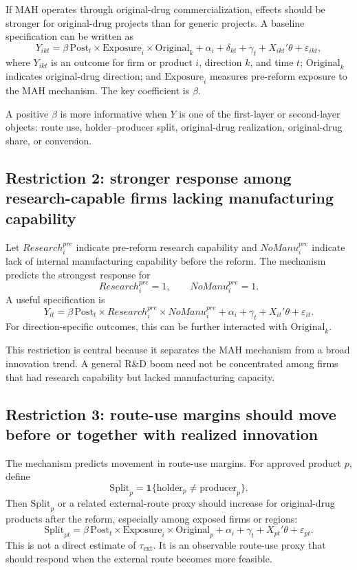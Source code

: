 \documentclass[12pt]{article}
\newcommand{\tauext}{\tau_{\mathrm{ext}}}
\newcommand{\Post}{\mathrm{Post}}
\newcommand{\Original}{\mathrm{Original}}
\newcommand{\Exposure}{\mathrm{Exposure}}
\newcommand{\Split}{\mathrm{Split}}
\newcommand{\one}{\mathbf{1}}
\begin{document}
If MAH operates through original-drug commercialization, effects should be stronger for original-drug projects than for generic projects. A baseline specification can be written as
\[
Y_{ikt}=\beta\,\Post_t\times \Exposure_i\times \Original_k
+\alpha_i+\delta_{kt}+\gamma_t+X_{ikt}'\theta+\varepsilon_{ikt},
\]
where $Y_{ikt}$ is an outcome for firm or product $i$, direction $k$, and time $t$; $\Original_k$ indicates original-drug direction; and $\Exposure_i$ measures pre-reform exposure to the MAH mechanism. The key coefficient is $\beta$.

A positive $\beta$ is more informative when $Y$ is one of the first-layer or second-layer objects: route use, holder--producer split, original-drug realization, original-drug share, or conversion.

\subsection{Restriction 2: stronger response among research-capable firms lacking manufacturing capability}

Let $Research_i^{pre}$ indicate pre-reform research capability and $NoManu_i^{pre}$ indicate lack of internal manufacturing capability before the reform. The mechanism predicts the strongest response for
\[
Research_i^{pre}=1,
\qquad
NoManu_i^{pre}=1.
\]
A useful specification is
\[
Y_{it}=\beta\,\Post_t\times Research_i^{pre}\times NoManu_i^{pre}
+\alpha_i+\gamma_t+X_{it}'\theta+\varepsilon_{it}.
\]
For direction-specific outcomes, this can be further interacted with $\Original_k$.

This restriction is central because it separates the MAH mechanism from a broad innovation trend. A general R\&D boom need not be concentrated among firms that had research capability but lacked manufacturing capacity.

\subsection{Restriction 3: route-use margins should move before or together with realized innovation}

The mechanism predicts movement in route-use margins. For approved product $p$, define
\[
\Split_p=\one\{\mathrm{holder}_p\neq \mathrm{producer}_p\}.
\]
Then $\Split_p$ or a related external-route proxy should increase for original-drug products after the reform, especially among exposed firms or regions:
\[
\Split_{pt}=\beta\,\Post_t\times \Exposure_i\times \Original_p
+\alpha_i+\gamma_t+X_{pt}'\theta+\varepsilon_{pt}.
\]
This is not a direct estimate of $\tauext$. It is an observable route-use proxy that should respond when the external route becomes more feasible.
\end{document}
